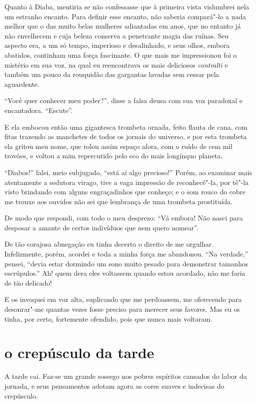 Quanto à Diaba, mentiria se não confessasse que à primeira vista
vislumbrei nela um estranho encanto. Para definir esse encanto, não
saberia compará"-lo a nada melhor que o das muito belas
mulheres adiantadas em anos, que no entanto já não envelhecem e cuja beleza
conserva a penetrante magia das ruínas. Seu aspecto era, a um só tempo,
imperioso e desalinhado, e seus olhos, embora abatidos, continham
uma força fascinante. O que mais me impressionou foi o mistério em sua voz,
na qual eu reencontrava os mais deliciosos \textit{contralti} e
também um pouco da rouquidão das gargantas lavadas sem cessar pela
aguardente.

``Você quer conhecer meu poder?'', disse a
falsa deusa com sua voz paradoxal e encantadora.
“Escute”.

E ela embocou então uma gigantesca trombeta ornada, feito flauta de
cana, com fitas trazendo as manchetes de todos os jornais do universo, e
por esta trombeta ela gritou meu nome, que rolou assim
espaço afora, com o ruído de cem mil trovões, e voltou a mim repercutido pelo
eco do mais longínquo planeta.

``Diabos!'' falei, meio subjugado, ``está aí algo precioso!'' Porém, ao examinar
mais atentamente a sedutora virago, tive a vaga impressão de
reconhecê"-la, por tê"-la visto brindando com alguns engraçadinhos
que conheço; e o som rouco do cobre me trouxe aos ouvidos não
sei que lembrança de uma trombeta prostituída.

De modo que respondi, com todo o meu desprezo: ``Vá embora! Não
nasci para desposar a amante de certos indivíduos que nem quero
nomear''.

De tão corajosa abnegação eu tinha decerto o direito de me orgulhar.
Infelizmente, porém, acordei e toda a minha força me abandonou.
``Na verdade,'' pensei, ``devia estar
dormindo um sono muito pesado para demonstrar tamanhos escrúpulos.'' Ah! quem dera
eles voltassem quando estou acordado, não me faria de tão
delicado!

E os invoquei em voz alta, suplicando que me perdoassem, me
oferecendo para desonrar"-me quantas vezes fosse preciso para merecer
seus favores. Mas eu os tinha, por certo, fortemente ofendido, pois que
nunca mais voltaram.

\quebra\section[O crepúsculo da tarde]{o crepúsculo da tarde}

A tarde cai. Faz-se um grande sossego nos pobres espíritos
cansados do labor da jornada, e seus pensamentos adotam agora as cores
suaves e indecisas do crepúsculo.

